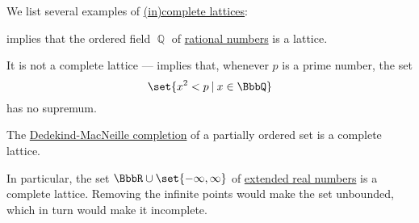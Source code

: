 \begin{proposition}\label{ex:def:complete_lattice}
  We list several examples of \hyperref[def:complete_lattice]{(in)complete lattices}:
  \begin{thmenum}
      implies that the ordered field \( \BbbQ \) of \hyperref[def:rational_numbers]{rational numbers} is a lattice.

    It is not a complete lattice ---  implies that, whenever \( p \) is a prime number, the set
    \begin{equation*}
      \set{ x^2 < p \given x \in \BbbQ }
    \end{equation*}
    has no supremum.

     The \hyperref[def:dedekind_macnielle_completion]{Dedekind-MacNeille completion} of a partially ordered set is a complete lattice.

    In particular, the set \( \BbbR \cup \set{ -\infty, \infty } \) of \hyperref[def:extended_real_numbers]{extended real numbers} is a complete lattice. Removing the infinite points would make the set unbounded, which in turn would make it incomplete.
  \end{thmenum}
\end{proposition}

